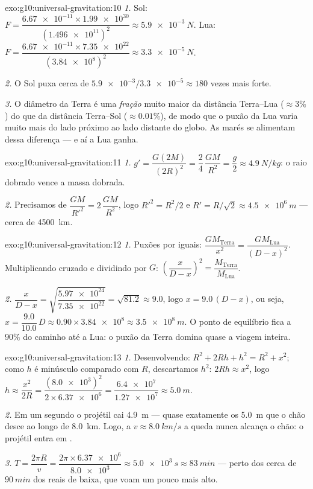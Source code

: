 \begin{solution}{exo:g10:universal-gravitation:10}
\emph{1.} Sol:
$F = \dfrac{\num{6.67e-11} \times \num{1.99e30}}{(\num{1.496e11})^2}
\approx \qty{5.9e-3}{N}$. Lua:
$F = \dfrac{\num{6.67e-11} \times \num{7.35e22}}{(\num{3.84e8})^2}
\approx \qty{3.3e-5}{N}$.

\emph{2.} O Sol puxa cerca de $\num{5.9e-3}/\num{3.3e-5} \approx 180$
vezes mais forte.

\emph{3.} O diâmetro da Terra é uma \emph{fração} muito maior da
distância Terra--Lua ($\approx 3\%$) do que da distância Terra--Sol
($\approx 0.01\%$), de modo que o puxão da Lua varia muito mais do lado
próximo ao lado distante do globo. As marés se alimentam dessa diferença
--- e aí a Lua ganha.
\end{solution}

\begin{solution}{exo:g10:universal-gravitation:11}
\emph{1.} $g' = \dfrac{G (2M)}{(2R)^2} = \dfrac{2}{4}\,\dfrac{GM}{R^2}
= \dfrac{g}{2} \approx \qty{4.9}{N/kg}$: o raio dobrado vence a massa
dobrada.

\emph{2.} Precisamos de $\dfrac{GM}{R'^2} = 2\,\dfrac{GM}{R^2}$, logo
$R'^2 = R^2/2$ e $R' = R/\sqrt{2} \approx \qty{4.5e6}{m}$ --- cerca de
\qty{4500}{km}.
\end{solution}

\begin{solution}{exo:g10:universal-gravitation:12}
\emph{1.} Puxões por  iguais:
$\dfrac{G M_{\text{Terra}}}{x^2} = \dfrac{G M_{\text{Lua}}}{(D-x)^2}$.
Multiplicando cruzado e dividindo por $G$:
$\left(\dfrac{x}{D-x}\right)^2 = \dfrac{M_{\text{Terra}}}{M_{\text{Lua}}}$.

\emph{2.} $\dfrac{x}{D-x}
= \sqrt{\dfrac{\num{5.97e24}}{\num{7.35e22}}} = \sqrt{81.2} \approx
9.0$, logo $x = 9.0\,(D - x)$, ou seja, $x = \dfrac{9.0}{10.0}\,D
\approx 0.90 \times \num{3.84e8} \approx \qty{3.5e8}{m}$. O ponto de
equilíbrio fica a $90\%$ do caminho até a Lua: o puxão da Terra domina
quase a viagem inteira.
\end{solution}

\begin{solution}{exo:g10:universal-gravitation:13}
\emph{1.} Desenvolvendo: $R^2 + 2Rh + h^2 = R^2 + x^2$; como $h$ é
minúsculo comparado com $R$, descartamos $h^2$: $2Rh \approx x^2$, logo
$h \approx \dfrac{x^2}{2R}
= \dfrac{(\num{8.0e3})^2}{2 \times \num{6.37e6}}
= \dfrac{\num{6.4e7}}{\num{1.27e7}} \approx \qty{5.0}{m}$.

\emph{2.} Em um segundo o projétil cai \qty{4.9}{m} --- quase exatamente
os \qty{5.0}{m} que o chão desce ao longo de \qty{8.0}{km}. Logo, a
$v \approx \qty{8.0}{km/s}$ a queda nunca alcança o chão: o projétil
entra em .

\emph{3.} $T = \dfrac{2\pi R}{v}
= \dfrac{2\pi \times \num{6.37e6}}{\num{8.0e3}}
\approx \qty{5.0e3}{s} \approx \qty{83}{min}$ --- perto dos cerca de
$\qty{90}{min}$ dos  reais de  baixa, que voam um pouco
mais alto.
\end{solution}

